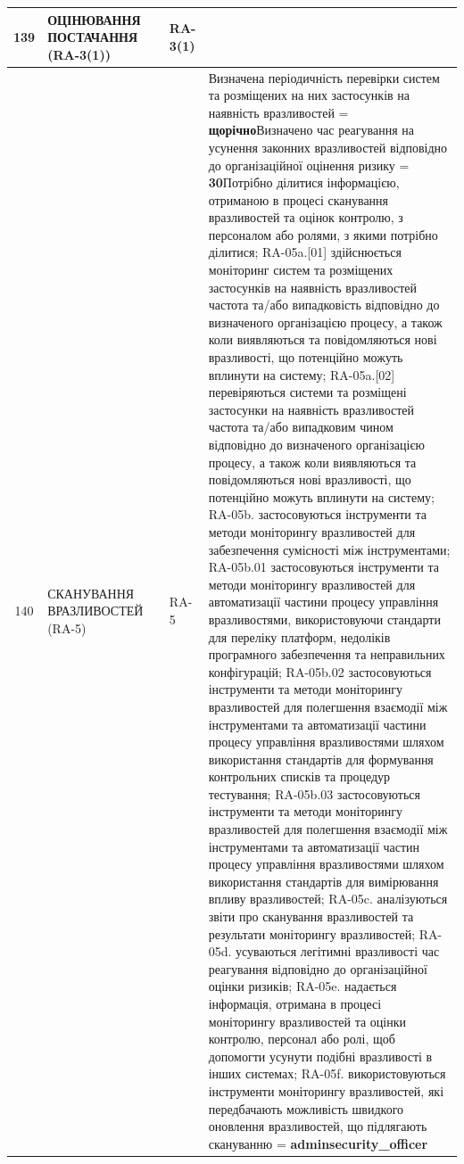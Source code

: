 \documentclass[10pt]{article}
\begin{document}
\begin{longtable}{|c|>{\raggedright\arraybackslash}p{4cm}|>{\raggedright\arraybackslash}p{2.5cm}|>{\raggedright\arraybackslash}p{3.5cm}|>{\raggedright\arraybackslash}p{5.5cm}|}
139 & ОЦІНЮВАННЯ ПОСТАЧАННЯ (RA-3(1)) &  & RA-3(1) &  \\ \hline
140 & СКАНУВАННЯ ВРАЗЛИВОСТЕЙ (RA-5) &  & RA-5 & Визначена періодичність перевірки систем та розміщених на них застосунків на наявність вразливостей = \textbf{щорічно}\newline Визначено час реагування на усунення законних вразливостей відповідно до організаційної оцінення ризику = \textbf{30}\newline Потрібно ділитися інформацією, отриманою в процесі сканування вразливостей та оцінок контролю, з персоналом або ролями, з якими потрібно ділитися; RA-05a.[01] здійснюється моніторинг систем та розміщених застосунків на наявність вразливостей частота та/або випадковість відповідно до визначеного організацією процесу, а також коли виявляються та повідомляються нові вразливості, що потенційно можуть вплинути на систему; RA-05a.[02] перевіряються системи та розміщені застосунки на наявність вразливостей частота та/або випадковим чином відповідно до визначеного організацією процесу, а також коли виявляються та повідомляються нові вразливості, що потенційно можуть вплинути на систему; RA-05b. застосовуються інструменти та методи моніторингу вразливостей для забезпечення сумісності між інструментами; RA-05b.01 застосовуються інструменти та методи моніторингу вразливостей для автоматизації частини процесу управління вразливостями, використовуючи стандарти для переліку платформ, недоліків програмного забезпечення та неправильних конфігурацій; RA-05b.02 застосовуються інструменти та методи моніторингу вразливостей для полегшення взаємодії між інструментами та автоматизації частини процесу управління вразливостями шляхом використання стандартів для формування контрольних списків та процедур тестування; RA-05b.03 застосовуються інструменти та методи моніторингу вразливостей для полегшення взаємодії між інструментами та автоматизації частин процесу управління вразливостями шляхом використання стандартів для вимірювання впливу вразливостей; RA-05c. аналізуються звіти про сканування вразливостей та результати моніторингу вразливостей; RA-05d. усуваються легітимні вразливості час реагування відповідно до організаційної оцінки ризиків; RA-05e. надається інформація, отримана в процесі моніторингу вразливостей та оцінки контролю, персонал або ролі, щоб допомогти усунути подібні вразливості в інших системах; RA-05f. використовуються інструменти моніторингу вразливостей, які передбачають можливість швидкого оновлення вразливостей, що підлягають скануванню = \textbf{adminsecurity\_\allowbreak{}officer} \\ \hline

\end{longtable}
\end{document}

